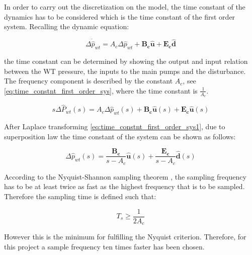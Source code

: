 In order to carry out the discretization on the model, the time constant of the dynamics has to be considered which is the time constant of the first order system. Recalling the dynamic equation:

\begin{equation}
\Delta \dot{\hat{p}}_{wt} = A_c \Delta \hat{p}_{wt}  + \bm{B_c} \bm{\hat{u}} + \bm{E_c} \bm{\hat{d}} 
\label{eq:cons_model_}
\end{equation}

the time constant can be determined by showing the output and input relation between the WT pressure, the inputs to the main pumps and the disturbance. The frequency component is described by the constant $A_c$, see \eqref{eq:time_constnt_first_order_sys}, where the time constant is $\frac{1}{A_c}$.

\begin{equation}
  s\Delta \hat{P}_{wt}(s) = A_c \Delta \hat{p}_{wt}(s)  + \bm{B_c} \bm{\hat{u}}(s) + \bm{E_c} \bm{\hat{u}} (s)
    \label{eq:time_constnt_first_order_sys1}
\end{equation}

After Laplace transforming \eqref{eq:time_constnt_first_order_sys1}, due to superposition law the time constant of the system can be shown as follows: 

\begin{equation}
  \Delta \hat{p}_{wt}(s) = \frac{\bm{B_c}}{s-A_c} \bm{\hat{u}}(s) + \frac{\bm{E_c}}{s-A_c} \bm{\hat{d}}(s)
  \label{eq:time_constnt_first_order_sys}
\end{equation}

According to the Nyquist-Shannon sampling theorem \citep{franklin1994feedback},
the sampling frequency has to be at least twice as fast as the highest frequency that is to be sampled. Therefore the sampling time is defined such that:

\begin{equation}
T_s \geq \frac{1}{2A_c}
 \label{sampling}
\end{equation}

However this is the minimum for fulfilling the Nyquist criterion. Therefore, for this project a sample frequency ten times faster has been chosen.



